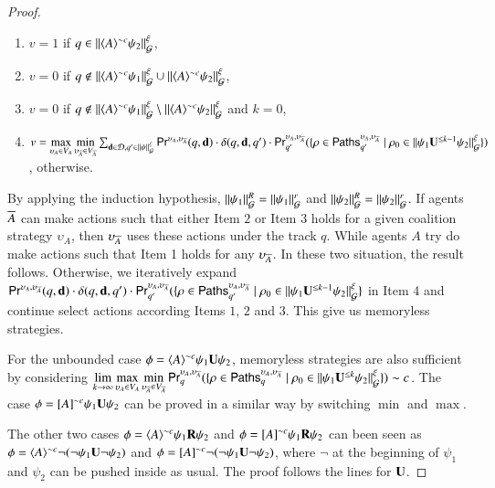 \begin{proof}
\begin{enumerate}
\item $v=1$ if $q\in \|{\langle{A}\rangle^{\sim c}\psi_2}\|_{\mathcal{G}}^\xi$,
\item $v=0$ if $q\not\in \|{\langle{A}\rangle^{\sim c}\psi_1}\|_{\mathcal{G}}^\xi\cup \|{\langle{A}\rangle^{\sim c}\psi_2}\|_{\mathcal{G}}^\xi$,
\item $v=0$ if $q\not\in \|{\langle{A}\rangle^{\sim c}\psi_1}\|_{\mathcal{G}}^\xi\setminus \|{\langle{A}\rangle^{\sim c}\psi_2}\|_{\mathcal{G}}^\xi$ and $k=0$,
\item $v= \max\limits_{\upsilon_A\in V_A} \min\limits_{\upsilon_{\overline{A}}\in V_{\overline{A}}} \sum_{{\bf d} \in\mathcal{D} , q'\in \|{\psi}\|_{\mathcal{G}}^\xi} \textsf{Pr}^{\upsilon_A,\upsilon_{\overline{A}}}(q,{\bf d})\cdot \delta(q,{\bf d},q')\cdot \\ \textsf{Pr}_{q'}^{\upsilon_A,\upsilon_{\overline{A}}} (\{\rho\in {\sf Paths}_{q'}^{\upsilon_A,\upsilon_{\overline{A}}}\mid \rho_0\in\|{\psi_1{\bf U}^{\leq k-1}\psi_2}\|_{\mathcal{G}}^\xi\})$, otherwise.
\end{enumerate}

By applying the induction hypothesis,
$\|{\psi_1}\|_{\mathcal{G}}^R=\|{\psi_1}\|_{\mathcal{G}}^r$ and
$\|{\psi_2}\|_{\mathcal{G}}^R=\|{\psi_2}\|_{\mathcal{G}}^r$. If agents $\overline{A}$ can make actions such that either Item $2$ or Item $3$ holds for a given coalition strategy $\upsilon_A$, then $\upsilon_{\overline{A}}$ uses these actions under the track $q$. While agents $A$ try do make actions such that Item 1 holds for any $\upsilon_{\overline{A}}$. In these two situation, the result follows.
Otherwise, we iteratively expand $\textsf{Pr}^{\upsilon_A,\upsilon_{\overline{A}}}(q,{\bf d})\cdot \delta(q,{\bf d},q')\cdot\textsf{Pr}_{q'}^{\upsilon_A,\upsilon_{\overline{A}}}(\{\rho\in {\sf Paths}_{q'}^{\upsilon_A,\upsilon_{\overline{A}}}\mid \rho_0\in\|{\psi_1{\bf U}^{\leq k-1}\psi_2}\|_{\mathcal{G}}^\xi\}$ in Item 4 and continue select actions according Items $1$, $2$ and $3$. This give us memoryless strategies.

For the unbounded case $\phi=\langle{A}\rangle^{\sim c}\psi_1{\bf U}\psi_2$, memoryless strategies are also sufficient by considering
$\lim\limits_{k\rightarrow\infty}\max\limits_{\upsilon_A\in V_A} \min\limits_{\upsilon_{\overline{A}}\in V_{\overline{A}}} \textsf{Pr}_q^{\upsilon_A,\upsilon_{\overline{A}}}(\{\rho\in {\sf Paths}_q^{\upsilon_A,\upsilon_{\overline{A}}}\mid \rho_0\in\|{\psi_1{\bf U}^{\leq k}\psi_2}\|_{\mathcal{G}}^\xi\})\sim c$.
The case $\phi=[{A}]^{\sim c}\psi_1{\bf U}\psi_2$ can be proved in a similar way by switching $\min$ and $\max$.

The other two cases $\phi=\langle{A}\rangle^{\sim c}\psi_1{\bf R}\psi_2$ and $\phi=[{A}]^{\sim c}\psi_1{\bf R}\psi_2$ can been seen as
$\phi=\langle{A}\rangle^{\sim c}\neg(\neg \psi_1{\bf U}\neg\psi_2)$  and $\phi=[{A}]^{\sim c}\neg(\neg\psi_1{\bf U}\neg \psi_2)$,
where $\neg$ at the beginning of $\psi_1$ and $\psi_2$ can be pushed inside as usual.
The proof follows the lines for ${\bf U}$.
\end{proof}

